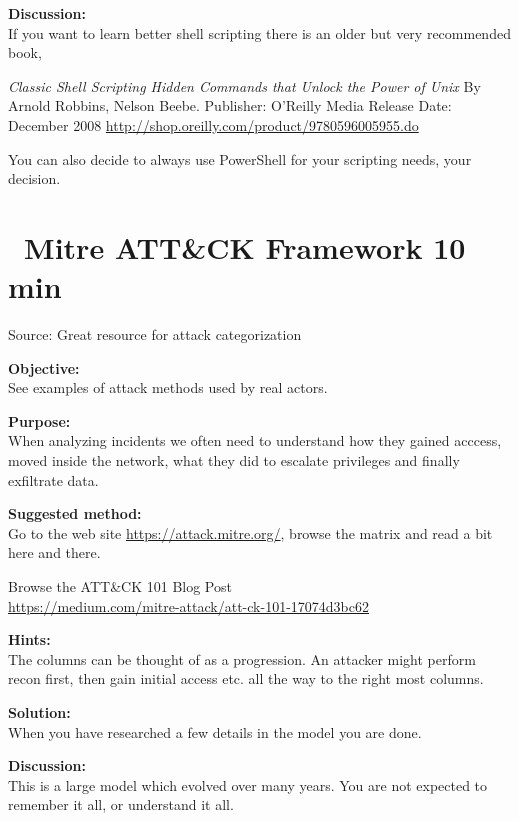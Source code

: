\documentclass[a4paper,11pt,notitlepage]{report}
\begin{document}
{\bf Discussion:}\\
If you want to learn better shell scripting there is an older but very recommended book,

\emph{Classic Shell Scripting
Hidden Commands that Unlock the Power of Unix}
By Arnold Robbins, Nelson Beebe. Publisher: O'Reilly Media
Release Date: December 2008
 \url{http://shop.oreilly.com/product/9780596005955.do}

You can also decide to always use PowerShell for your scripting needs, your decision.


\chapter{\faExclamationTriangle\ Mitre ATT\&CK Framework 10 min}
\label{ex:mitre-attack}



Source:  Great resource for attack categorization



{\bf Objective:}\\
See examples of attack methods used by real actors.


{\bf Purpose:}\\
When analyzing incidents we often need to understand how they gained acccess, moved inside the network, what they did to escalate privileges and finally exfiltrate data.

{\bf Suggested method:}\\
Go to the web site \url{https://attack.mitre.org/}, browse the matrix and read a bit here and there.

Browse the ATT\&CK 101 Blog Post\\
\url{https://medium.com/mitre-attack/att-ck-101-17074d3bc62}


{\bf Hints:}\\
The columns can be thought of as a progression. An attacker might perform recon first, then gain initial access etc. all the way to the right most columns.

{\bf Solution:}\\
When you have researched a few details in the model you are done.

{\bf Discussion:}\\
This is a large model which evolved over many years. You are not expected to remember it all, or understand it all.
\end{document}
